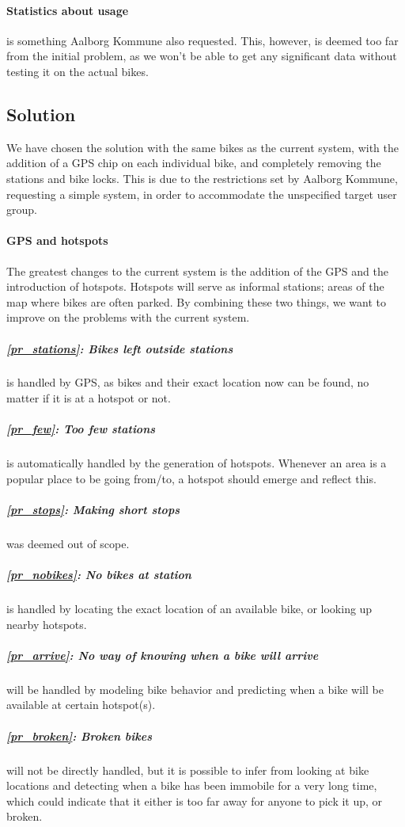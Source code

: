 \paragraph{Statistics about usage} is something Aalborg Kommune also requested.
This, however, is deemed too far from the initial problem, as we won't be able to get any significant data without testing it on the actual bikes.

\subsection{Solution} \label{prob_statement:solution}
We have chosen the solution with the same bikes as the current system, with the addition of a GPS chip on each individual bike, and completely removing the stations and bike locks.
This is due to the restrictions set by Aalborg Kommune, requesting a simple system, in order to accommodate the unspecified target user group.

\paragraph{GPS and hotspots}
The greatest changes to the current system is the addition of the GPS and the introduction of hotspots.
Hotspots will serve as informal stations; areas of the map where bikes are often parked.
By combining these two things, we want to improve on the problems with the current system.

\subparagraph{\ref{pr_stations}: Bikes left outside stations} is handled by GPS, as bikes and their exact location now can be found, no matter if it is at a hotspot or not.

\subparagraph{\ref{pr_few}: Too few stations} is automatically handled by the generation of hotspots.
Whenever an area is a popular place to be going from/to, a hotspot should emerge and reflect this.

\subparagraph{\ref{pr_stops}: Making short stops} was deemed out of scope.

\subparagraph{\ref{pr_nobikes}: No bikes at station} is handled by locating the exact location of an available bike, or looking up nearby hotspots.

\subparagraph{\ref{pr_arrive}: No way of knowing when a bike will arrive} will be handled by modeling bike behavior and predicting when a bike will be available at certain hotspot(s).

\subparagraph{\ref{pr_broken}: Broken bikes} will not be directly handled, but it is possible to infer from looking at bike locations and detecting when a bike has been immobile for a very long time, which could indicate that it either is too far away for anyone to pick it up, or broken.

